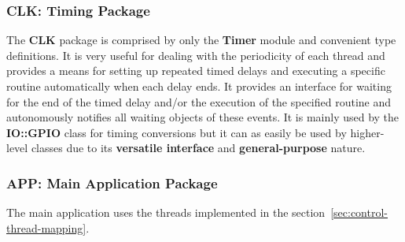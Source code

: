 
%
\subsubsection{CLK: Timing Package}
The \textbf{CLK} package is comprised by only the \textbf{Timer} module and convenient type definitions. It is very useful for dealing with the periodicity of each thread and provides a means for setting up repeated timed delays and executing a specific routine automatically when each delay ends. It provides an interface for waiting for the end of the timed delay and/or the execution of the specified routine and autonomously notifies all waiting objects of these events.
It is mainly used by the \textbf{IO::GPIO} class for timing conversions but it can as easily be used by higher-level classes due to its \textbf{versatile interface} and \textbf{general-purpose} nature.
%

%
\subsubsection{APP: Main Application Package}
%
The main application uses the threads implemented in the section~\ref{sec:control-thread-mapping}.

